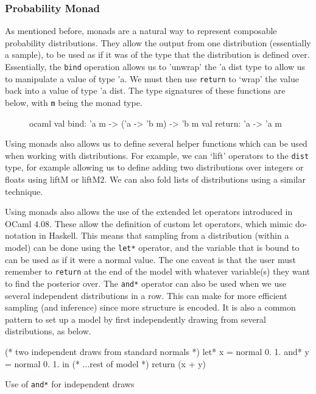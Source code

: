 \subsubsection{Probability Monad}
	
As mentioned before, monads are a natural way to represent composable probability distributions. They allow the output from one distribution (essentially a sample), to be used as if it was of the type that the distribution is defined over. Essentially, the \texttt{bind} operation allows us to 'unwrap' the 'a dist type to allow us to manipulate a value of type 'a. We must then use \texttt{return} to `wrap' the value back into a value of type 'a dist. The type signatures of these functions are below, with \texttt{m} being the monad type.
\begin{figure}[!htb]
\centering
\begin{cminted}{ocaml}
val bind: 'a m -> ('a -> 'b m) -> 'b m
val return: 'a -> 'a m
\end{cminted}
\end{figure}
Using monads also allows us to define several helper functions which can be used when working with distributions. For example, we can `lift' operators to the \texttt{dist} type, for example allowing us to define adding two distributions over integers or floats using liftM or liftM2. We can also fold lists of distributions using a similar technique.
	
Using monads also allows the use of the extended let operators introduced in OCaml 4.08. These allow the definition of custom let operators, which mimic do-notation in Haskell. This means that sampling from a distribution (within a model) can be done using the \texttt{let*} operator, and the variable that is bound to can be used as if it were a normal value. The one caveat is that the user must remember to \texttt{return} at the end of the model with whatever variable(s) they want to find the posterior over. The \texttt{and*} operator can also be used when we use several independent distributions in a row. This can make for more efficient sampling (and inference) since more structure is encoded. It is also a common pattern to set up a model by first independently drawing from several distributions, as below.

\begin{listing}
\begin{ocamlcode-in}
(* two independent draws from standard normals *)
let* x = normal 0. 1.
and* y = normal 0. 1. in
(* ...rest of model  *)
return (x + y)
\end{ocamlcode-in}
\caption{Use of \texttt{and*} for independent draws}
\end{listing}


